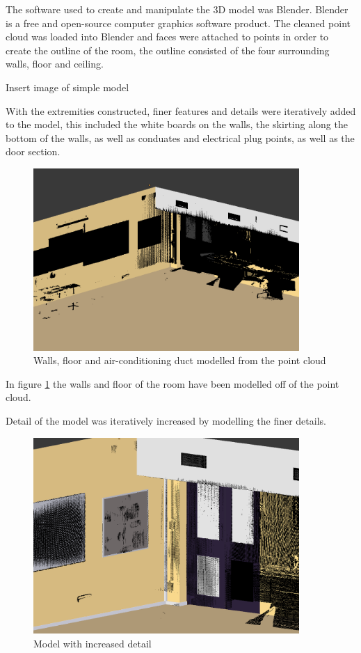 \documentclass[11pt,a4paper]{report}
\begin{document}
				The software used to create and manipulate the 3D model was Blender. Blender is a free and open-source computer graphics software product. The cleaned point cloud was loaded into Blender and faces were attached to points in order to create the outline of the room, the outline consisted of the four surrounding walls, floor and ceiling. 
				
				{Insert image of simple model}
				
				With the extremities constructed, finer features and details were iteratively added to the model, this included the white boards on the walls, the skirting along the bottom of the walls, as well as conduates and electrical plug points, as well as the door section.
				
				\begin{figure}[H]
					\centering
					\includegraphics[width=0.9\textwidth]{simple_model_with_pc}
					\caption{Walls, floor and air-conditioning duct modelled from the point cloud}
					\label{fig:simple_model}
				\end{figure}
				
				In figure \ref{fig:simple_model} the walls and floor of the room have been modelled off of the point cloud. 
				
				Detail of the model was iteratively increased by modelling the finer details.
				
				\begin{figure}[H]
					\centering
					\includegraphics[width=0.9\textwidth]{model_with_increased_detail}
					\caption{Model with increased detail}
					\label{fig:more_complex_model}
				\end{figure}
				
\end{document}
